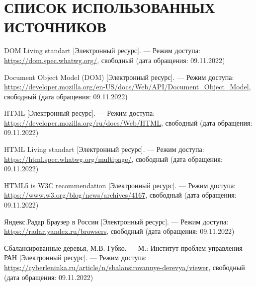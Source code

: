 \section*{СПИСОК ИСПОЛЬЗОВАННЫХ ИСТОЧНИКОВ}

\begingroup
\renewcommand{\section}[2]{}
\begin{thebibliography}{}
	
	DOM Living standart [Электронный ресурс]. --- Режим доступа: \url{https://dom.spec.whatwg.org/}, свободный (дата обращения: 09.11.2022)
	
	Document Object Model (DOM) [Электронный ресурс]. --- Режим доступа: \url{https://developer.mozilla.org/en-US/docs/Web/API/Document_Object_Model}, свободный (дата обращения: 09.11.2022)
	
	HTML [Электронный ресурс]. --- Режим доступа: \url{https://developer.mozilla.org/ru/docs/Web/HTML}, свободный (дата обращения: 09.11.2022)
	
	HTML Living standart [Электронный ресурс]. --- Режим доступа: \url{https://html.spec.whatwg.org/multipage/}, свободный (дата обращения: 09.11.2022)
	
	HTML5 is W3C recommendation [Электронный ресурс]. --- Режим доступа: \url{https://www.w3.org/blog/news/archives/4167}, свободный (дата обращения: 09.11.2022)
	
	Яндекс.Радар Браузер в России [Электронный ресурс]. --- Режим доступа:
	\url{https://radar.yandex.ru/browsers}, свободный (дата обращения: 09.11.2022)
	
	Сбалансированные деревья, М.В. Губко. --- М.: Институт проблем управления РАН [Электронный ресурс]. --- Режим доступа: \url{https://cyberleninka.ru/article/n/sbalansirovannye-derevya/viewer}, свободный (дата обращения: 09.11.2022)
\end{thebibliography}
\endgroup

\pagebreak